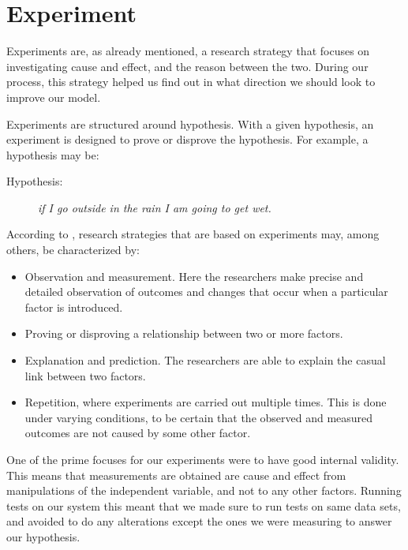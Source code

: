 
\section{Experiment}
\label{sec:experiment}
Experiments are, as already mentioned, a research strategy that focuses on investigating cause and effect, and the reason between the two. During our process, this strategy helped us find out in what direction we should look to improve our model.

Experiments are structured around hypothesis. With a given hypothesis, an experiment is designed to prove or disprove the hypothesis. For example, a hypothesis may be:

\begin{description}
    \item[Hypothesis:]{\textit{if I go outside in the rain I am going to get wet.}}
\end{description}

According to \citep{oates2005researching}, research strategies that are based on experiments may, among others, be characterized by:

\begin{itemize}
    \item Observation and measurement. Here the researchers make precise and detailed observation of outcomes and changes that occur when a particular factor is introduced.
    \item Proving or disproving a relationship between two or more factors.
    \item Explanation and prediction. The researchers are able to explain the casual link between two factors.
    \item Repetition, where experiments are carried out multiple times. This is done under varying conditions, to be certain that the observed and measured outcomes are not caused by some other factor.
\end{itemize}

One of the prime focuses for our experiments were to have good internal validity. This means that measurements are obtained are cause and effect from manipulations of the independent variable, and not to any other factors. Running tests on our system this meant that we made sure to run tests on same data sets, and avoided to do any alterations except the ones we were measuring to answer our hypothesis.



